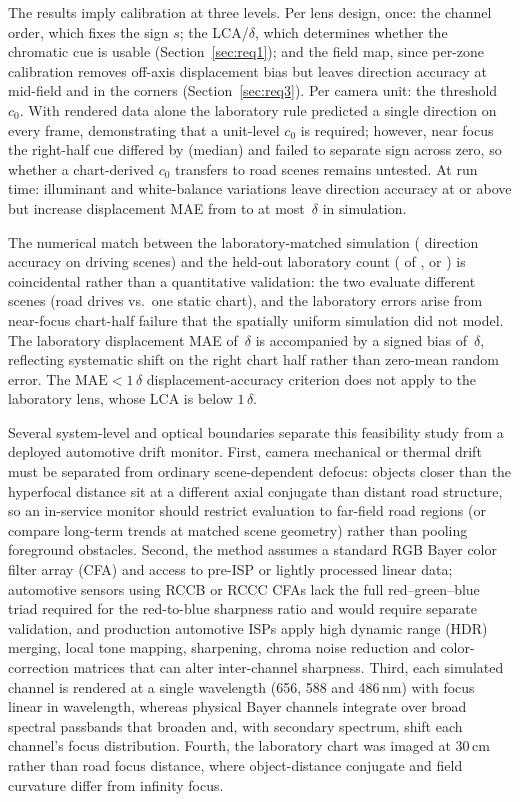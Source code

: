 \documentclass{ieee-ojvt}
\begin{document}
The results imply calibration at three levels. Per lens design, once: the channel order, which fixes the sign $s$; the LCA/$\delta$, which determines whether the chromatic cue is usable (Section~\ref{sec:req1}); and the field map, since per-zone calibration removes off-axis displacement bias but leaves direction accuracy at \MsevenZcMidDir{} mid-field and \MsevenZcCornerDir{} in the corners (Section~\ref{sec:req3}). Per camera unit: the threshold $c_0$. With rendered data alone the laboratory rule predicted a single direction on every frame, demonstrating that a unit-level $c_0$ is required; however, near focus the right-half cue differed by \LabTrOffsetNear{} (median) and failed to separate sign across zero, so whether a chart-derived $c_0$ transfers to road scenes remains untested. At run time: illuminant and white-balance variations leave direction accuracy at or above \MsixDirMin{} but increase displacement MAE from \MsixMaeNominal{} to at most \MsixMaeMax\,$\delta$ in simulation.

The numerical match between the laboratory-matched simulation (\MfiveDir{} direction accuracy on driving scenes) and the held-out laboratory count (\LabTestOrderOk{} of \LabTestOrderN{}, or \LabTestOrderDir) is coincidental rather than a quantitative validation: the two evaluate different scenes (road drives vs.\ one static chart), and the laboratory errors arise from near-focus chart-half failure that the spatially uniform simulation did not model. The laboratory displacement MAE of \LabTestCalMae\,$\delta$ is accompanied by a signed bias of \LabTestCalBias\,$\delta$, reflecting systematic shift on the right chart half rather than zero-mean random error. The $\mathrm{MAE}<1\,\delta$ displacement-accuracy criterion does not apply to the laboratory lens, whose LCA is below $1\,\delta$.

Several system-level and optical boundaries separate this feasibility study from a deployed automotive drift monitor. First, camera mechanical or thermal drift must be separated from ordinary scene-dependent defocus: objects closer than the hyperfocal distance sit at a different axial conjugate than distant road structure, so an in-service monitor should restrict evaluation to far-field road regions (or compare long-term trends at matched scene geometry) rather than pooling foreground obstacles. Second, the method assumes a standard RGB Bayer color filter array (CFA) and access to pre-ISP or lightly processed linear data; automotive sensors using RCCB or RCCC CFAs lack the full red--green--blue triad required for the red-to-blue sharpness ratio and would require separate validation, and production automotive ISPs apply high dynamic range (HDR) merging, local tone mapping, sharpening, chroma noise reduction and color-correction matrices that can alter inter-channel sharpness. Third, each simulated channel is rendered at a single wavelength (656, 588 and 486\,nm) with focus linear in wavelength, whereas physical Bayer channels integrate over broad spectral passbands that broaden and, with secondary spectrum, shift each channel's focus distribution. Fourth, the laboratory chart was imaged at 30\,cm rather than road focus distance, where object-distance conjugate and field curvature differ from infinity focus.
\end{document}
